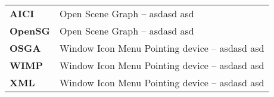 

\begin{tabular}{ll}

\textbf{AICI} & Open Scene Graph -- asdasd asd \\

\textbf{OpenSG} & Open Scene Graph -- asdasd asd \\

\textbf{OSGA} & Window Icon Menu Pointing device -- asdasd asd \\

\textbf{WIMP} & Window Icon Menu Pointing device -- asdasd asd \\

\textbf{XML} & Window Icon Menu Pointing device -- asdasd asd \\

\end{tabular}
